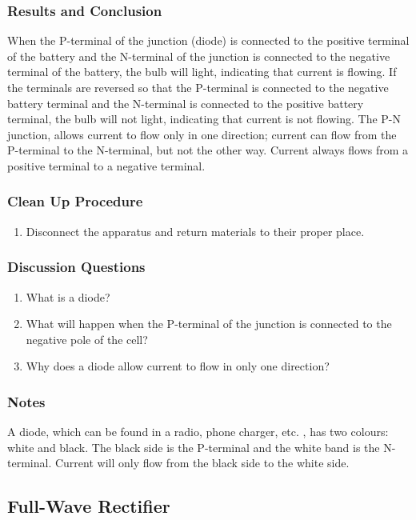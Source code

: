 \subsubsection*{Results and Conclusion}
When the P-terminal of the junction (diode) is connected to the positive terminal of the battery and the N-terminal of the junction is connected to the negative terminal of the battery, the bulb will light, indicating that current is flowing.  
If the terminals are reversed so that the P-terminal is connected to the negative battery terminal and the N-terminal is connected to the positive battery terminal, the bulb will not light, indicating that current is not flowing.  
The P-N junction, allows current to flow only in one direction; current can flow from the P-terminal to the N-terminal, but not the other way.  
Current always flows from a positive terminal to a negative terminal.  

\subsubsection*{Clean Up Procedure}
\begin{enumerate}
\item{Disconnect the apparatus and return materials to their proper place.} 
\end{enumerate}

\subsubsection*{Discussion Questions}
\begin{enumerate}
\item{What is a diode?}
\item{What will happen when the P-terminal of the junction is connected to the negative pole of the cell?}
\item{Why does a diode allow current to flow in only one direction?}
\end{enumerate}

\subsubsection*{Notes}
A diode, which can be found in a radio, phone charger, etc.  , has two colours: white and black. The black side is the P-terminal and the white band is the N-terminal. Current will only flow from the black side to the white side.  

\subsection{Full-Wave Rectifier}

